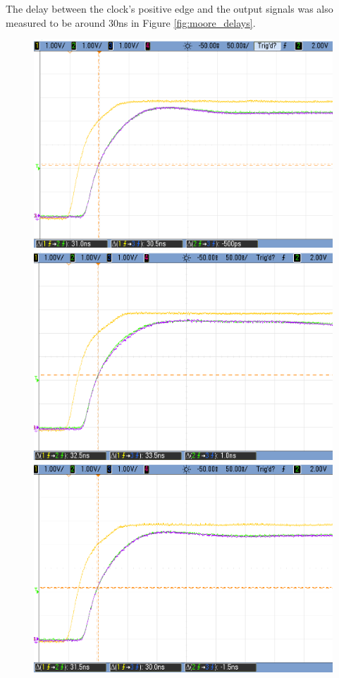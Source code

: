 The delay between the clock's positive edge and the output signals was also measured to be around 30ns in Figure \ref{fig:moore_delays}.

\begin{figure}[H]
 \begin{center}
        \includegraphics[scale=0.3]{../Exercise1/Moore/report/images/e3e1_1.png}\\
        \includegraphics[scale=0.3]{../Exercise1/Moore/report/images/e3e1_1k.png}\\
        \includegraphics[scale=0.3]{../Exercise1/Moore/report/images/e3e1_100k_.png}

\end{center}
\end{figure}

